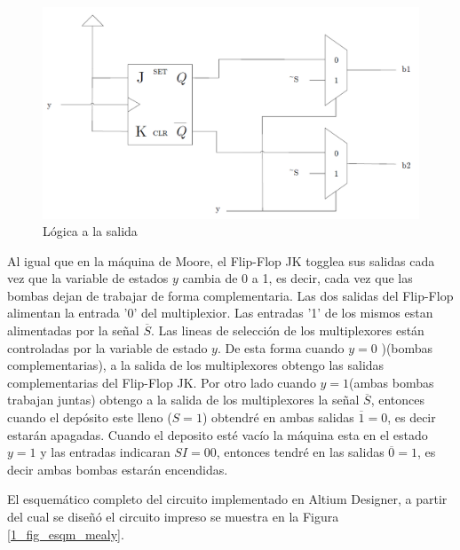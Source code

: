\begin{figure}[H]
\centering
\includegraphics[scale=0.3]{images/multiplexion_mealy.png}
\caption{Lógica a la salida}
\label{1_salida_mealy}
\end{figure}

Al igual que en la máquina de Moore, el Flip-Flop JK togglea sus salidas cada vez que la variable de estados $y$ cambia de 0 a 1, es decir, cada vez que las bombas dejan de trabajar de forma complementaria. Las dos salidas del Flip-Flop alimentan la entrada '0' del multiplexior. Las entradas '1' de los mismos estan alimentadas por la señal $\overline{S}$. Las lineas de selección de los multiplexores están controladas por la variable de estado $y$. De esta forma cuando $y=0$ )(bombas complementarias), a la salida de los multiplexores obtengo las salidas complementarias del Flip-Flop JK. Por otro lado cuando $y=1$(ambas bombas trabajan juntas) obtengo a la salida de los multiplexores la señal $\overline{S}$, entonces cuando el depósito este lleno ($S=1$) obtendré en ambas salidas $\overline{1}=0$, es decir estarán apagadas. Cuando el deposito esté vacío la máquina esta en el estado $y=1$ y las entradas indicaran $SI=00$, entonces tendré en las salidas $\overline{0}=1$, es decir ambas bombas estarán encendidas.

El esquemático completo del circuito implementado en Altium Designer, a partir del cual se diseñó el circuito impreso se muestra en la Figura \ref{1_fig_esqm_mealy}.

